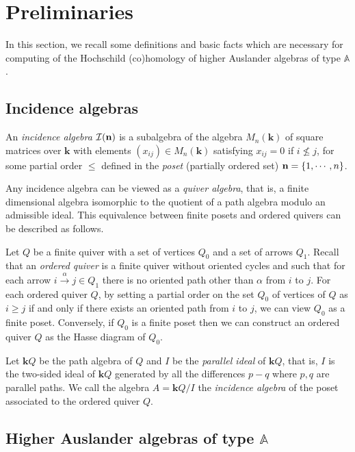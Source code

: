 \documentclass{amsart}
\newcommand{\A}{\mathbb{A}}
\newcommand{\bk}{\mathbf{k}}
\newcommand{\I}{\mathcal{I}}
\theoremstyle{plain}
\theoremstyle{definition}
\numberwithin{equation}{section}
\begin{document}
\section{Preliminaries}
In this section, we recall some definitions and basic facts which are necessary for computing of the Hochschild (co)homology of higher Auslander algebras of type $\A$. %


\subsection{Incidence algebras}\label{sec:inci-alg}

An {\it incidence algebra} $\I({\bf n})$ is a subalgebra of the algebra $M_n(\bk)$ of square matrices over $\bk$ with elements $(x_{ij})\in M_n(\bk)$ satisfying $x_{ij}=0$ if $i\nleq j$, for some partial order $\leq$ defined in the {\it poset} (partially ordered set) ${\bf n}=\{1,\cdots,n\}$. 

Any incidence algebra can be viewed as a {\it quiver algebra}, that is, a finite dimensional algebra isomorphic to the quotient of a path algebra modulo an admissible ideal. This equivalence between finite posets and ordered quivers can be described as follows. 

Let $Q$ be a finite quiver with a set of vertices $Q_0$ and a set of arrows $Q_1$. Recall that an {\it ordered quiver} is a finite quiver without oriented cycles and such that for each arrow $i \xrightarrow{\alpha} j \in Q_1$ there is no oriented path other than $\alpha$ from $i$ to $j$. For each ordered quiver $Q$, by setting a partial order on the set $Q_0$ of vertices of $Q$ as $i\geq j$ if and only if there exists an oriented path from $i$ to $j$, we can view $Q_0$ as a finite poset. Conversely, if $Q_0$ is a finite poset then we can construct an ordered quiver $Q$ as the Hasse diagram of $Q_0$.

Let $\bk Q$ be the path algebra of $Q$ and $I$ be the {\it parallel ideal} of $\bk Q$, that is, $I$ is the two-sided ideal of $\bk Q$ generated by all the differences $p-q$ where $p,q$ are parallel paths. We call the algebra $A=\bk Q/I$ the {\it incidence algebra} of the poset associated to the ordered quiver $Q$.

\subsection{Higher Auslander algebras of type $\A$}
\end{document}
